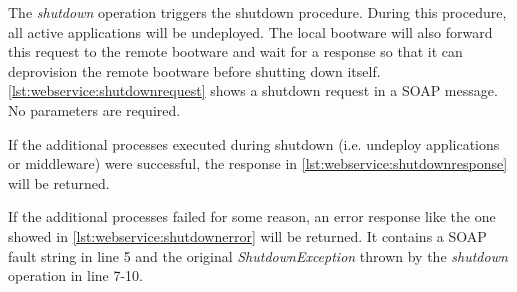 The \textit{shutdown} operation triggers the shutdown procedure.
During this procedure, all active applications will be undeployed.
The local bootware will also forward this request to the remote bootware and wait for a response so that it can deprovision the remote bootware before shutting down itself.
\autoref{lst:webservice:shutdownrequest} shows a shutdown request in a SOAP message.
No parameters are required.

\vspace*{\baselineskip}

If the additional processes executed during shutdown (i.e. undeploy applications or middleware) were successful, the response in \autoref{lst:webservice:shutdownresponse} will be returned.

\vspace*{\baselineskip}

If the additional processes failed for some reason, an error response like the one showed in \autoref{lst:webservice:shutdownerror} will be returned.
It contains a SOAP fault string in line 5 and the original \textit{ShutdownException} thrown by the \textit{shutdown} operation in line 7-10.

\vspace*{\baselineskip}
